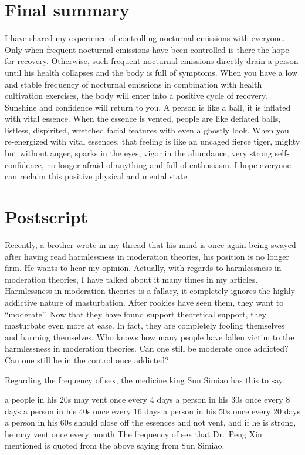 \documentclass[
]{book}
\begin{document}
\hypertarget{final-summary-4}{%
\section{Final summary}\label{final-summary-4}}

I have shared my experience of controlling nocturnal emissions with everyone. Only when frequent nocturnal emissions have been controlled is there the hope for recovery. Otherwise, such frequent nocturnal emissions directly drain a person until his health collapses and the body is full of symptoms. When you have a low and stable frequency of nocturnal emissions in combination with health cultivation exercises, the body will enter into a positive cycle of recovery. Sunshine and confidence will return to you. A person is like a ball, it is inflated with vital essence. When the essence is vented, people are like deflated balls, listless, dispirited, wretched facial features with even a ghostly look. When you re-energized with vital essences, that feeling is like an uncaged fierce tiger, mighty but without anger, sparks in the eyes, vigor in the abundance, very strong self-confidence, no longer afraid of anything and full of enthusiasm. I hope everyone can reclaim this positive physical and mental state.

\hypertarget{postscript}{%
\section{Postscript}\label{postscript}}

Recently, a brother wrote in my thread that his mind is once again being swayed after having read harmlessness in moderation theories, his position is no longer firm. He wants to hear my opinion. Actually, with regards to harmlessness in moderation theories, I have talked about it many times in my articles. Harmlessness in moderation theories is a fallacy, it completely ignores the highly addictive nature of masturbation. After rookies have seen them, they want to ``moderate''. Now that they have found support theoretical support, they masturbate even more at ease. In fact, they are completely fooling themselves and harming themselves. Who knows how many people have fallen victim to the harmlessness in moderation theories. Can one still be moderate once addicted? Can one still be in the control once addicted?

Regarding the frequency of sex, the medicine king Sun Simiao has this to say:

a people in his 20s may vent once every 4 days
a person in his 30s once every 8 days
a person in his 40s once every 16 days
a person in his 50s once every 20 days
a person in his 60s should close off the essences and not vent, and if he is strong, he may vent once every month
The frequency of sex that Dr.~Peng Xin mentioned is quoted from the above saying from Sun Simiao.
\end{document}
